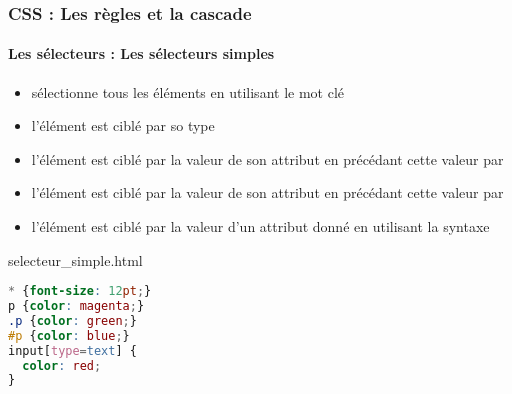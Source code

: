 \documentclass[xcolor=table]{beamer}
\begin{document}
\begin{frame}[fragile]
\frametitle{CSS : Les règles et la cascade}
\framesubtitle{Les sélecteurs : Les sélecteurs simples}

\begin{minipage}{0.60\textwidth} 
	\begin{itemize}
		\item {} sélectionne tous les éléments en utilisant le mot clé \keyword{*}
		\item {} l'élément est ciblé par so type
		\item {} l'élément est ciblé par la valeur de son attribut  en précédant cette valeur par 
		\item {} l'élément est ciblé par la valeur de son attribut  en précédant cette valeur par \keyword{\#}
		\item {} l'élément est ciblé par la valeur d'un attribut donné en utilisant la syntaxe 
	\end{itemize}
\end{minipage}
%
\begin{minipage}{0.38\textwidth}
\begin{block}{selecteur\_simple.html}
\scriptsize\bfseries
\begin{lstlisting}[language={CSS}]
* {font-size: 12pt;}
p {color: magenta;}
.p {color: green;}
#p {color: blue;}
input[type=text] {
  color: red;
}
\end{lstlisting}
\end{block}
\end{minipage}
\end{frame}
\end{document}
